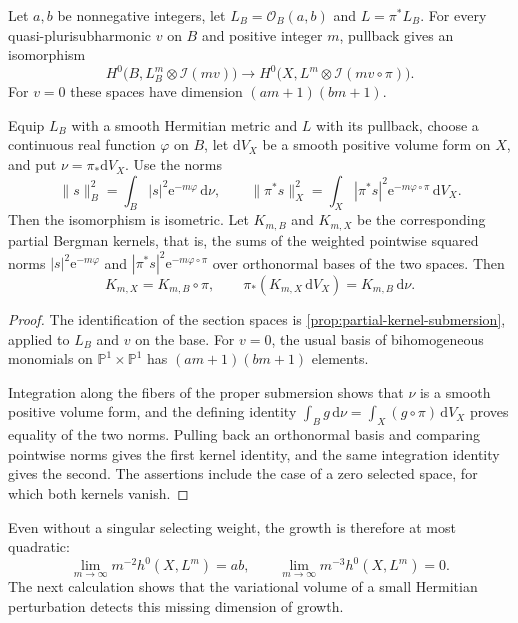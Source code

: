 \begin{proposition}\label{prop:elliptic-selected-section-descent}
Let $a,b$ be nonnegative integers, let $L_B=\mathcal O_B(a,b)$ and $L=\pi^*L_B$. For every quasi-plurisubharmonic $v$ on $B$ and positive integer $m$, pullback gives an isomorphism
\[
 H^0\bigl(B,L_B^m\otimes\mathcal I(mv)\bigr)
   \longrightarrow
 H^0\bigl(X,L^m\otimes\mathcal I(mv\circ\pi)\bigr).
\]
For $v=0$ these spaces have dimension $(am+1)(bm+1)$.

Equip $L_B$ with a smooth Hermitian metric and $L$ with its pullback, choose a continuous real function $\varphi$ on $B$, let $\mathrm{d}V_X$ be a smooth positive volume form on $X$, and put $\nu=\pi_*\mathrm{d}V_X$. Use the norms
\[
 \|s\|_B^2=\int_B|s|^2\mathrm{e}^{-m\varphi}\,\mathrm{d}\nu,
 \qquad
 \|\pi^*s\|_X^2=\int_X|\pi^*s|^2
                \mathrm{e}^{-m\varphi\circ\pi}\,\mathrm{d}V_X.
\]
Then the isomorphism is isometric. Let $K_{m,B}$ and $K_{m,X}$ be the corresponding partial Bergman kernels, that is, the sums of the weighted pointwise squared norms $|s|^2\mathrm{e}^{-m\varphi}$ and $|\pi^*s|^2\mathrm{e}^{-m\varphi\circ\pi}$ over orthonormal bases of the two spaces. Then
\[
 K_{m,X}=K_{m,B}\circ\pi,
 \qquad \pi_*(K_{m,X}\,\mathrm{d}V_X)=K_{m,B}\,\mathrm{d}\nu.
\]
\end{proposition}
\begin{proof}
The identification of the section spaces is \cref{prop:partial-kernel-submersion}, applied to $L_B$ and $v$ on the base. For $v=0$, the usual basis of bihomogeneous monomials on $\mathbb P^1\times\mathbb P^1$ has $(am+1)(bm+1)$ elements.

Integration along the fibers of the proper submersion shows that $\nu$ is a smooth positive volume form, and the defining identity $\int_Bg\,\mathrm d\nu=\int_X(g\circ\pi)\,\mathrm dV_X$ proves equality of the two norms. Pulling back an orthonormal basis and comparing pointwise norms gives the first kernel identity, and the same integration identity gives the second. The assertions include the case of a zero selected space, for which both kernels vanish.
\end{proof}

Even without a singular selecting weight, the growth is therefore at most quadratic:
\[
 \lim_{m\to\infty}m^{-2}h^0(X,L^m)=ab,
 \qquad \lim_{m\to\infty}m^{-3}h^0(X,L^m)=0.
\]
The next calculation shows that the variational volume of a small Hermitian perturbation detects this missing dimension of growth.

